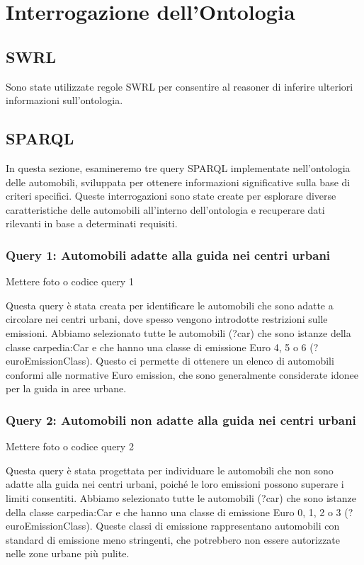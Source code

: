 \chapter{Interrogazione dell'Ontologia}

\section{SWRL}\label{sec:swrl}
Sono state utilizzate regole SWRL per consentire al reasoner di inferire ulteriori informazioni sull'ontologia.

\section{SPARQL}\label{sec:sparql}

In questa sezione, esamineremo tre query SPARQL implementate nell'ontologia delle automobili,
sviluppata per ottenere informazioni significative sulla base di criteri specifici.
Queste interrogazioni sono state create per esplorare diverse caratteristiche delle automobili all'interno
dell'ontologia e recuperare dati rilevanti in base a determinati requisiti.

\subsection{Query 1: Automobili adatte alla guida nei centri urbani}

Mettere foto o codice query 1

Questa query è stata creata per identificare le automobili che sono adatte a circolare nei centri urbani,
dove spesso vengono introdotte restrizioni sulle emissioni.
Abbiamo selezionato tutte le automobili (?car) che sono istanze della classe carpedia:Car e che hanno una
classe di emissione Euro 4, 5 o 6 (?euroEmissionClass).
Questo ci permette di ottenere un elenco di automobili conformi alle normative Euro emission, che sono generalmente
considerate idonee per la guida in aree urbane.

\subsection{Query 2: Automobili non adatte alla guida nei centri urbani}

Mettere foto o codice query 2

Questa query è stata progettata per individuare le automobili che non sono adatte alla guida nei centri urbani,
poiché le loro emissioni possono superare i limiti consentiti.
Abbiamo selezionato tutte le automobili (?car) che sono istanze della classe carpedia:Car e che hanno una
classe di emissione Euro 0, 1, 2 o 3 (?euroEmissionClass).
Queste classi di emissione rappresentano automobili con standard di emissione meno stringenti,
che potrebbero non essere autorizzate nelle zone urbane più pulite.

